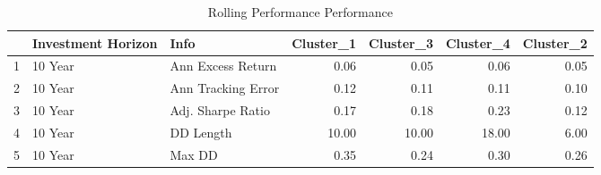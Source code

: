 \documentclass[11pt,preprint, authoryear]{elsarticle}
\numberwithin{equation}{section}
\numberwithin{figure}{section}
\numberwithin{table}{section}
\begin{document}
\begin{longtable}{rllrrrr}
\caption{Rolling Performance Performance \label{tab15}} \\ 
  \hline
 & Investment Horizon & Info & Cluster\_1 & Cluster\_3 & Cluster\_4 & Cluster\_2 \\ 
  \hline
1 & 10 Year & Ann Excess Return & 0.06 & 0.05 & 0.06 & 0.05 \\ 
  2 & 10 Year & Ann Tracking Error & 0.12 & 0.11 & 0.11 & 0.10 \\ 
  3 & 10 Year & Adj. Sharpe Ratio & 0.17 & 0.18 & 0.23 & 0.12 \\ 
  4 & 10 Year & DD Length & 10.00 & 10.00 & 18.00 & 6.00 \\ 
  5 & 10 Year & Max DD & 0.35 & 0.24 & 0.30 & 0.26 \\ 
   \hline
\hline
\end{longtable}


\end{document}
